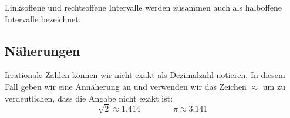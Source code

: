 Linksoffene und rechtsoffene Intervalle werden zusammen auch als halboffene Intervalle bezeichnet.

\subsection{Näherungen}

Irrationale Zahlen können wir nicht exakt als Dezimalzahl notieren. In diesem Fall geben wir eine Annäherung an und verwenden wir das Zeichen $\approx$ um zu verdeutlichen, dass die Angabe nicht exakt ist:
\[
  \sqrt{2} \approx 1.414 \qquad\qquad \pi \approx 3.141
\]
